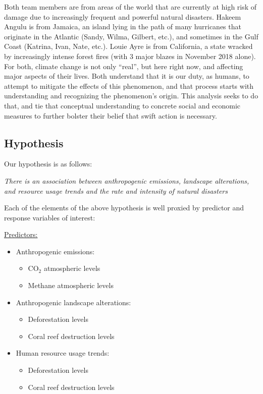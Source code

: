 \documentclass[10pt,]{article}
\begin{document}
Both team members are from areas of the world that are currently at high
risk of damage due to increasingly frequent and powerful natural
disasters. Hakeem Angulu is from Jamaica, an island lying in the path of
many hurricanes that originate in the Atlantic (Sandy, Wilma, Gilbert,
etc.), and sometimes in the Gulf Coast (Katrina, Ivan, Nate, etc.).
Louie Ayre is from California, a state wracked by increasingly intense
forest fires (with 3 major blazes in November 2018 alone). For both,
climate change is not only ``real'', but here right now, and affecting
major aspects of their lives. Both understand that it is our duty, as
humans, to attempt to mitigate the effects of this phenomenon, and that
process starts with understanding and recognizing the phenomenon's
origin. This analysis seeks to do that, and tie that conceptual
understanding to concrete social and economic measures to further
bolster their belief that swift action is necessary.

\newpage

\subsection{Hypothesis}\label{hypothesis}

Our hypothesis is as follows:

\textit{There is an association between anthropogenic emissions, landscape alterations, and resource usage trends and the rate and intensity of natural disasters}

Each of the elements of the above hypothesis is well proxied by
predictor and response variables of interest:

\underline{Predictors:}

\begin{itemize}
  \item Anthropogenic emissions:
  \begin{itemize}
    \item CO$_2$ atmospheric levels
    \item Methane atmospheric levels
  \end{itemize}
  \item Anthropogenic landscape alterations:
  \begin{itemize}
    \item Deforestation levels
    \item Coral reef destruction levels
  \end{itemize}
  \item Human resource usage trends:
  \begin{itemize}
    \item Deforestation levels
    \item Coral reef destruction levels
  \end{itemize}
\end{itemize}
\end{document}
